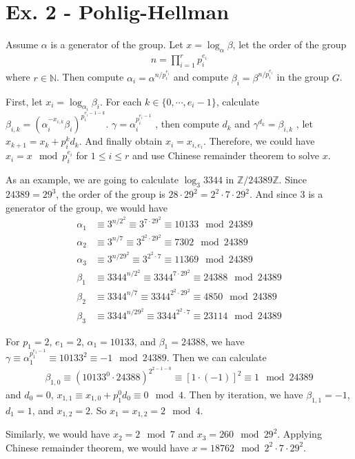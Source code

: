 \documentclass[a4paper,12pt]{journal}
\begin{document}
\section*{Ex. 2 - Pohlig-Hellman}
\par Assume $\alpha$ is a generator of the group. Let $x = \log_{\alpha}\beta$, let the order of the group
\begin{align*}
	n = \prod_{i=1}^{r} p_{i}^{e_{i}}
\end{align*}
where $r \in \mathbb{N}$. Then compute $\alpha_{i} = \alpha^{n/p_{i}^{e_{i}}}$ and compute $\beta_{i} = \beta^{n/p_{i}^{e_{i}}}$ in the group $G$. 
\par First,  let $x_{i} = \log_{\alpha_{i}}\beta_{i}$. For each $k \in \{0, \cdots, e_{i}-1\}$, calculate $\beta_{i,k} = (\alpha_{i}^{-x_{i,k}}\beta_{i})^{p_{i}^{e_{i}-1-k}}$.  $\gamma = \alpha_{i}^{p_{i}^{e_{i}-1}}$ , then compute $d_{k}$ and  $\gamma^{d_{k}} = \beta_{i,k}$ , let $x_{k+1} = x_{k} + p_{i}^{k}d_{k}$. And finally obtain $x_{i} = x_{i,e_{i}}$. Therefore, we could have $x_{i} = x \mod p_{i}^{e_{i}}$ for $1 \leq i \leq r$ and use Chinese remainder theorem to solve $x$.
\par As an example, we are going to calculate $\log_{3}3344$ in $\mathbb{Z}/24389\mathbb{Z}$. Since $24389 = 29^{3}$, the order of the group is $28\cdot 29^{2} = 2^{2}\cdot 7\cdot 29^{2}$. And since $3$ is a generator of the group, we would have
\begin{align*}
	\alpha_{1} &\equiv 3^{n/2^{2}} \equiv 3^{7\cdot 29^{2}} \equiv 10133 \mod 24389 \\
	\alpha_{2} &\equiv 3^{n/7} \equiv 3^{2^{2}\cdot 29^{2}} \equiv 7302 \mod 24389 \\
	\alpha_{3} &\equiv 3^{n/29^{2}} \equiv 3^{2^{2}\cdot 7} \equiv 11369 \mod 24389 \\
	\beta_{1} &\equiv 3344^{n/2^{2}} \equiv 3344^{7\cdot 29^{2}} \equiv 24388 \mod 24389 \\
	\beta_{2} &\equiv 3344^{n/7} \equiv 3344^{2^{2}\cdot 29^{2}} \equiv 4850 \mod 24389 \\
	\beta_{3} &\equiv 3344^{n/29^{2}} \equiv 3344^{2^{2}\cdot 7} \equiv 23114 \mod 24389
\end{align*}
\par For $p_{1} = 2$, $e_{1} = 2$, $\alpha_{1} = 10133$, and $\beta_{1} = 24388$, we have $\gamma \equiv \alpha_{1}^{p_{1}^{e_{1}-1}} \equiv 10133^{2} \equiv -1 \mod 24389$. Then we can calculate
\begin{align*}
	\beta_{1,0} \equiv (10133^{0}\cdot 24388)^{2^{2-1-0}} \equiv [1\cdot (-1)]^{2} \equiv 1 \mod 24389
\end{align*}
and $d_{0} = 0$, $x_{1,1} \equiv x_{1,0} + p_{1}^{0}d_{0} \equiv 0 \mod 4$. Then by iteration, we have $\beta_{1,1} = -1$, $d_{1} = 1$, and $x_{1,2} = 2$. So $x_{1} = x_{1,2} = 2 \mod 4$.
\par Similarly, we would have $x_{2} = 2 \mod 7$ and $x_{3} = 260 \mod 29^{2}$. Applying Chinese remainder theorem, we would have $x = 18762 \mod 2^{2}\cdot 7\cdot 29^{2}$.
\end{document}
